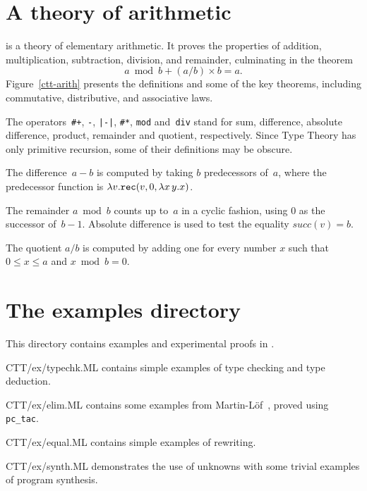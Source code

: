 \section{A theory of arithmetic}
 is a theory of elementary arithmetic.  It proves the
properties of addition, multiplication, subtraction, division, and
remainder, culminating in the theorem
\[ a \bmod b + (a/b)\times b = a. \]
Figure~\ref{ctt-arith} presents the definitions and some of the key
theorems, including commutative, distributive, and associative laws.

The operators~\verb'#+', \verb'-', \verb'|-|', \verb'#*', \verb'mod'
and~\verb'div' stand for sum, difference, absolute difference, product,
remainder and quotient, respectively.  Since Type Theory has only primitive
recursion, some of their definitions may be obscure.  

The difference~$a-b$ is computed by taking $b$ predecessors of~$a$, where
the predecessor function is $\lambda v. {\tt rec}(v, 0, \lambda x\,y.x)$.

The remainder $a\bmod b$ counts up to~$a$ in a cyclic fashion, using 0
as the successor of~$b-1$.  Absolute difference is used to test the
equality $succ(v)=b$.

The quotient $a/b$ is computed by adding one for every number $x$
such that $0\leq x \leq a$ and $x\bmod b = 0$.



\section{The examples directory}
This directory contains examples and experimental proofs in {\CTT}.
\begin{ttdescription}
\item[CTT/ex/typechk.ML]
contains simple examples of type checking and type deduction.

\item[CTT/ex/elim.ML]
contains some examples from Martin-L\"of~\cite{martinlof84}, proved using 
{\tt pc_tac}.

\item[CTT/ex/equal.ML]
contains simple examples of rewriting.

\item[CTT/ex/synth.ML]
demonstrates the use of unknowns with some trivial examples of program
synthesis. 
\end{ttdescription}


